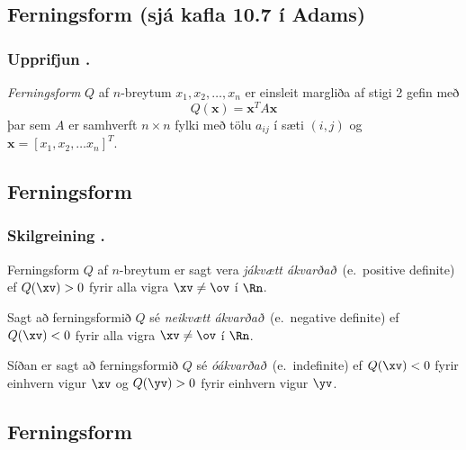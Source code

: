 

\subsection{Ferningsform (sjá kafla 10.7 í Adams)} 

\subsubsection{Upprifjun \kaflanr.}
{\em \color{red} Ferningsform} $Q$ af $n$-breytum $x_1,x_2,\ldots, x_n$ er einsleit margliða af stigi 2 gefin með 
\begin {equation*}
Q(\mathbf{x}) = \mathbf{x}^T A \mathbf{x}
\end {equation*}
þar sem $A$ er samhverft $n \times n$ fylki með tölu $a_{ij}$ í sæti $(i,j)$ og $\mathbf{x} = [x_1,x_2,\ldots x_n]^T$.







\subsection{Ferningsform} 

\subsubsection{Skilgreining \kaflanr.}
Ferningsform $Q$ af $n$-breytum er sagt vera
{\em \color{red} jákvætt ákvarðað}\  (e.~positive definite) ef $Q(\xv)>0$ fyrir
alla vigra $\xv\neq \ov$ í $\Rn$.   

\medskip
Sagt að ferningsformið $Q$ sé
{\em \color{red} neikvætt ákvarðað}\  (e.~negative definite) ef $Q(\xv)<0$ fyrir
alla vigra $\xv\neq \ov$ í $\Rn$.   

\medskip
Síðan er sagt að ferningsformið $Q$ sé
{\em  \color{red} óákvarðað}\  (e.~indefinite) ef $Q(\xv)<0$ fyrir
einhvern vigur $\xv$  og $Q(\yv)>0$ fyrir einhvern vigur
$\yv$. 





\subsection{Ferningsform} 

